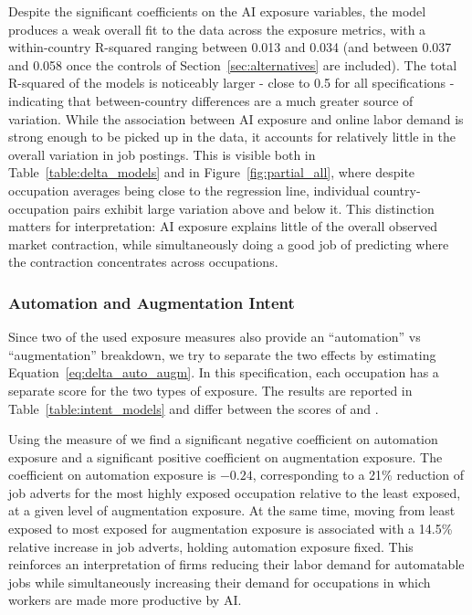 \documentclass[11pt]{article}
\begin{document}
Despite the significant coefficients on the AI exposure variables, the model produces a weak overall fit to the data across the exposure metrics, with a within-country R-squared ranging between 0.013 and 0.034 (and between 0.037 and 0.058 once the controls of Section~\ref{sec:alternatives} are included). The total R-squared of the models is noticeably larger - close to 0.5 for all specifications - indicating that between-country differences are a much greater source of variation. While the association between AI exposure and online labor demand is strong enough to be picked up in the data, it accounts for relatively little in the overall variation in job postings. This is visible both in Table~\ref{table:delta_models} and in Figure~\ref{fig:partial_all}, where despite occupation averages being close to the regression line, individual country-occupation pairs exhibit large variation above and below it. This distinction matters for interpretation: AI exposure explains little of the overall observed market contraction, while simultaneously doing a good job of predicting where the contraction concentrates across occupations.

\subsubsection{Automation and Augmentation Intent}

Since two of the used exposure measures also provide an ``automation'' vs ``augmentation'' breakdown, we try to separate the two effects by estimating Equation~\ref{eq:delta_auto_augm}. In this specification, each occupation has a separate score for the two types of exposure. The results are reported in Table~\ref{table:intent_models} and differ between the scores of \citet{handa2025economic} and \citet{demirev2024assessing}.

Using the measure of \citet{handa2025economic} we find a significant negative coefficient on automation exposure and a significant positive coefficient on augmentation exposure. The coefficient on automation exposure is $-0.24$, corresponding to a 21\% reduction of job adverts for the most highly exposed occupation relative to the least exposed, at a given level of augmentation exposure. At the same time, moving from least exposed to most exposed for augmentation exposure is associated with a 14.5\% relative increase in job adverts, holding automation exposure fixed. This reinforces an interpretation of firms reducing their labor demand for automatable jobs while simultaneously increasing their demand for occupations in which workers are made more productive by AI.
\end{document}
